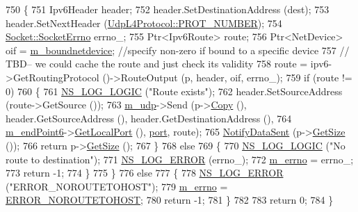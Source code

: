 \begin{DoxyCode}
750     \{
751       Ipv6Header header;
752       header.SetDestinationAddress (dest);
753       header.SetNextHeader (\hyperlink{classns3_1_1UdpL4Protocol_ad370801b3d1a166e831020a777c41047}{UdpL4Protocol::PROT\_NUMBER});
754       \hyperlink{classns3_1_1Socket_ada1328c5ae0c28cb2a982caf8f6d6cca}{Socket::SocketErrno} errno\_;
755       Ptr<Ipv6Route> route;
756       Ptr<NetDevice> oif = \hyperlink{classns3_1_1Socket_a9781d8dfdb5e9364d5dce8f53b768bb5}{m\_boundnetdevice}; \textcolor{comment}{//specify non-zero if bound to a specific
       device}
757       \textcolor{comment}{// TBD-- we could cache the route and just check its validity}
758       route = ipv6->GetRoutingProtocol ()->RouteOutput (p, header, oif, errno\_); 
759       \textcolor{keywordflow}{if} (route != 0)
760         \{
761           \hyperlink{group__logging_ga88acd260151caf2db9c0fc84997f45ce}{NS\_LOG\_LOGIC} (\textcolor{stringliteral}{"Route exists"});
762           header.SetSourceAddress (route->GetSource ());
763           \hyperlink{classns3_1_1UdpSocketImpl_ace4b90c1ab6f4f302cdb4cd8da973514}{m\_udp}->Send (p->\hyperlink{classns3_1_1Packet_a5d5c70802a5f77fc5f0001e0cfc1898b}{Copy} (), header.GetSourceAddress (), header.GetDestinationAddress (),
764                        \hyperlink{classns3_1_1UdpSocketImpl_ad8b59997645c24d4550092d138270652}{m\_endPoint6}->\hyperlink{classns3_1_1Ipv6EndPoint_a39a9fd4aa85a8ecbbf2d6c84d589080b}{GetLocalPort} (), \hyperlink{dsdv-manet_8cc_a8e0798404bf2cf5dabb84c5ba9a4f236}{port}, route);
765           \hyperlink{classns3_1_1Socket_ae478fc503f7041a1da5e9db361f1ae20}{NotifyDataSent} (p->\hyperlink{classns3_1_1Packet_a462855c9929954d4301a4edfe55f4f1c}{GetSize} ());
766           \textcolor{keywordflow}{return} p->\hyperlink{classns3_1_1Packet_a462855c9929954d4301a4edfe55f4f1c}{GetSize} ();
767         \}
768       \textcolor{keywordflow}{else} 
769         \{
770           \hyperlink{group__logging_ga88acd260151caf2db9c0fc84997f45ce}{NS\_LOG\_LOGIC} (\textcolor{stringliteral}{"No route to destination"});
771           \hyperlink{group__logging_ga0261a8db1d4ac5f79417d117634fd455}{NS\_LOG\_ERROR} (errno\_);
772           \hyperlink{classns3_1_1UdpSocketImpl_ac35998e8aa2cc588e21752944b0a0095}{m\_errno} = errno\_;
773           \textcolor{keywordflow}{return} -1;
774         \}
775     \}
776   \textcolor{keywordflow}{else}
777     \{
778       \hyperlink{group__logging_ga0261a8db1d4ac5f79417d117634fd455}{NS\_LOG\_ERROR} (\textcolor{stringliteral}{"ERROR\_NOROUTETOHOST"});
779       \hyperlink{classns3_1_1UdpSocketImpl_ac35998e8aa2cc588e21752944b0a0095}{m\_errno} = \hyperlink{classns3_1_1Socket_ada1328c5ae0c28cb2a982caf8f6d6ccaa0f8ecb5a4ddbce3bade35fa12c3d49e8}{ERROR\_NOROUTETOHOST};
780       \textcolor{keywordflow}{return} -1;
781     \}
782 
783   \textcolor{keywordflow}{return} 0;
784 \}
\end{DoxyCode}


